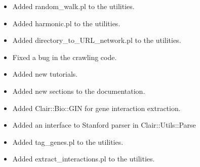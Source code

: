 \begin{itemize}
\item 

Added random\_walk.pl to the utilities.


\item 

Added harmonic.pl to the utilities.


\item 

Added directory\_to\_URL\_network.pl to the utilities.


\item 

Fixed a bug in the crawling code.


\item 

Added new tutorials.


\item 

Added new sections to the documentation.


\item 

Added Clair::Bio::GIN for gene interaction extraction.


\item 

Added an interface to Stanford parser in Clair::Utils::Parse


\item 

Added tag\_genes.pl to the utilities.


\item 

Added extract\_interactions.pl to the utilities.

\end{itemize}

